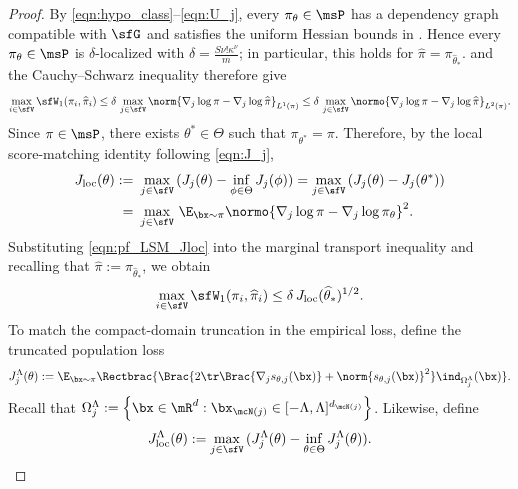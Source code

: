 \documentclass[11pt]{article}
\begin{document}
\begin{proof}
By \eqref{eqn:hypo_class}--\eqref{eqn:U_j}, every $\pi_\theta\in\msP$ has a dependency graph compatible with $\sfG$ and satisfies the uniform Hessian bounds in . Hence every $\pi_\theta\in\msP$ is $\delta$-localized with $\delta = \frac{S \nu! \kappa^\nu }{m}$; in particular, this holds for $\widehat\pi=\pi_{\widehat{\theta}_*}$.
 and the Cauchy--Schwarz inequality therefore give
\[
    \max_{i \in \sfV} \sfW_1(\pi_i,\widehat{\pi}_i)\le \delta\, \max_{j\in \sfV} \norm{ \nabla_j \log \pi - \nabla_j \log \widehat{\pi} }_{L^1(\pi)} \le \delta\, \max_{j\in \sfV} \normo{ \nabla_j \log \pi - \nabla_j \log \widehat{\pi} }_{L^2(\pi)}.
\]
Since $\pi \in \msP$, there exists $\theta^* \in \Theta$ such that $\pi_{\theta^*} = \pi$. Therefore, by the local score-matching identity following \eqref{eqn:J_j},
\begin{equation}
\label{eqn:pf_LSM_Jloc}
\begin{split}
    J_{\rm loc}(\theta) :=~& \max_{j \in \sfV}\, ( J_j(\theta) - \inf_{\phi \in \Theta} J_j(\phi) )
    = \max_{j \in \sfV}\, ( J_j(\theta) - J_j(\theta^*) ) \\
    =~& \max_{j \in \sfV}\, \E_{\bx \sim \pi} \normo{ \nabla_j \log \pi - \nabla_j \log \pi_{\theta} }^2.
\end{split}
\end{equation}
Substituting \eqref{eqn:pf_LSM_Jloc} into the marginal transport inequality and recalling that $\widehat{\pi} := \pi_{\widehat{\theta}_*}$, we obtain
\begin{equation}
\label{eqn:pf_LSM_step1}
    \max_{i \in \sfV} \sfW_1(\pi_i,\widehat{\pi}_i) \le \delta\, J_{\rm loc}(\widehat{\theta}_*)^{1/2}.
\end{equation}
%
To match the compact-domain truncation in the empirical loss, define the truncated population loss
\begin{equation}
\label{eqn:pf_LSM_Jloc_hat}
    J_j^\Lambda(\theta) := \E_{\bx \sim \pi} \Rectbrac{ \Brac{ 2 \tr \Brac{ \nabla_j s_{\theta,j} (\bx) } + \norm{s_{\theta,j}(\bx)}^2 } \ind_{\Omega_j^\Lambda} (\bx) }.
\end{equation}
Recall that $\Omega_j^\Lambda := \left\{ \bx\in\mR^d : \bx_{\mcN(j)}\in[-\Lambda,\Lambda]^{d_{\mcN(j)}} \right\}$.
Likewise, define
\begin{equation}
\label{eqn:pf_LSM_Jloc_hat_emp}
    J_{\rm loc}^\Lambda(\theta) := \max_{j \in \sfV}\, ( J_j^\Lambda(\theta) - \inf_{\theta \in \Theta} J_j^\Lambda(\theta) ).
\end{equation}

\end{proof}
\end{document}
